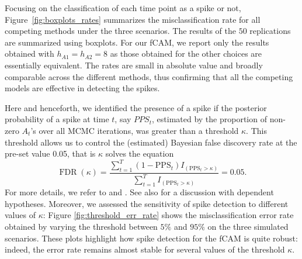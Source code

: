 Focusing on the classification of each time point as a spike or not, Figure~\ref{fig:boxplots_rates} summarizes the misclassification rate for all competing methods under the three scenarios. The results of the $50$ replications are summarized using boxplots. For our fCAM, we report only the results obtained with $h_{A1} = h_{A2} = 8$ as those obtained for the other choices are essentially equivalent. 
The rates are small in absolute value and broadly comparable across the different methods, thus confirming that all the competing models are effective in detecting the spikes.  

Here and henceforth, we identified the presence of a spike if the posterior probability of a spike at time $t$, say $PPS_t$, estimated by the proportion of non-zero $A_t$'s over all MCMC iterations, was greater than a threshold $\kappa$. This threshold allows us to control the (estimated) Bayesian false discovery rate at the pre-set value 0.05, that is $\kappa$ solves the equation $$\operatorname{FDR}\left(\kappa\right)=\frac{\sum_{t=1}^{T}\left(1-\mathrm{PPS}_{t}\right) I_{\left(\mathrm{PPS}_{t}>\kappa\right)}}
{ \left.\sum_{t=1}^{T} I_{\left(\mathrm{PPS}_{t}>\kappa\right)} \right.
}=0.05.$$ For more details, we refer to \textcite{newton2004} and \textcite{Muller07}. See also \textcite{SunReich2015} for a discussion with dependent hypotheses.
Moreover, we assessed the sensitivity of spike detection to different values of $\kappa$: Figure \ref{fig:threshold_err_rate} shows the misclassification error rate obtained by varying the threshold between $5\%$ and $95\%$ on the three simulated scenarios. These plots highlight how spike detection for the fCAM is quite robust: indeed, the error rate remains almost stable for several values of the threshold $\kappa$.
